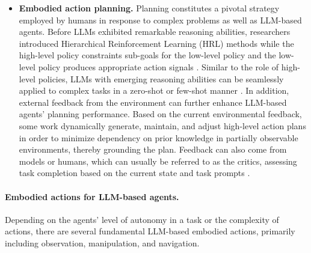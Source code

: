 \begin{itemize}[leftmargin=*]
    \item \textbf{Embodied action planning.}
    Planning constitutes a pivotal strategy employed by humans in response to complex problems as well as LLM-based agents. Before LLMs exhibited remarkable reasoning abilities, researchers introduced Hierarchical Reinforcement Learning (HRL) methods while the high-level policy constraints sub-goals for the low-level policy and the low-level policy produces appropriate action signals \cite{DBLP:conf/corl/LiXMS19,DBLP:journals/corr/abs-2012-10147,DBLP:conf/nips/00070C22}. Similar to the role of high-level policies, LLMs with emerging reasoning abilities \cite{DBLP:journals/tmlr/WeiTBRZBYBZMCHVLDF22} can be seamlessly applied to complex tasks in a zero-shot or few-shot manner \cite{DBLP:conf/nips/Wei0SBIXCLZ22, DBLP:conf/iclr/0002WSLCNCZ23, DBLP:conf/iclr/ZhouSHWS0SCBLC23, DBLP:journals/corr/abs-2305-14497}. In addition, external feedback from the environment can further enhance LLM-based agents' planning performance. Based on the current environmental feedback, some work \cite{DBLP:journals/corr/abs-2212-04088, DBLP:conf/iclr/YaoZYDSN023, shinn2023reflexion, DBLP:journals/corr/abs-2306-03604} dynamically generate, maintain, and adjust high-level action plans in order to minimize dependency on prior knowledge in partially observable environments, thereby grounding the plan. Feedback can also come from models or humans, which can usually be referred to as the critics, assessing task completion based on the current state and task prompts \cite{DBLP:journals/corr/abs-2303-08774, DBLP:journals/corr/abs-2305-16291}.
\end{itemize}

\paragraph{Embodied actions for LLM-based agents.} 
Depending on the agents' level of autonomy in a task or the complexity of actions, there are several fundamental LLM-based embodied actions, primarily including observation, manipulation, and navigation. 

